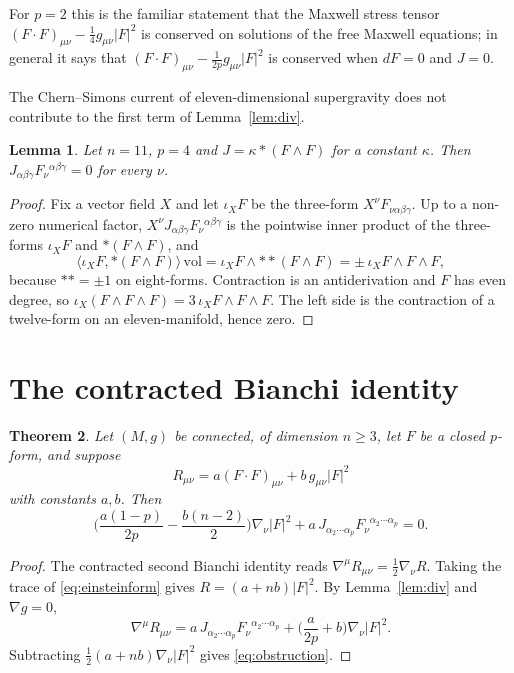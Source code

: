 \documentclass[11pt]{amsart}
\newtheorem{theorem}{Theorem}[section]
\newtheorem{lemma}[theorem]{Lemma}
\theoremstyle{definition}
\newcommand{\FF}{(F\!\cdot\! F)}
\begin{document}
For $p=2$ this is the familiar statement that the Maxwell stress tensor $\FF_{\mu\nu}-\frac14g_{\mu\nu}|F|^2$ is conserved on solutions of the free Maxwell equations; in general it says that $\FF_{\mu\nu}-\frac{1}{2p}g_{\mu\nu}|F|^2$ is conserved when $dF=0$ and $J=0$.

The Chern--Simons current of eleven-dimensional supergravity does not contribute to the first term of Lemma~\ref{lem:div}.

\begin{lemma}\label{lem:cs}
Let $n=11$, $p=4$ and $J=\kappa\ast(F\wedge F)$ for a constant $\kappa$. Then $J_{\alpha\beta\gamma}F_\nu{}^{\alpha\beta\gamma}=0$ for every $\nu$.
\end{lemma}

\begin{proof}
Fix a vector field $X$ and let $\iota_XF$ be the three-form $X^\nu F_{\nu\alpha\beta\gamma}$. Up to a non-zero numerical factor, $X^\nu J_{\alpha\beta\gamma}F_\nu{}^{\alpha\beta\gamma}$ is the pointwise inner product of the three-forms $\iota_XF$ and $\ast(F\wedge F)$, and
\[
\langle\iota_XF,\ast(F\wedge F)\rangle\,\mathrm{vol}=\iota_XF\wedge\ast\ast(F\wedge F)=\pm\,\iota_XF\wedge F\wedge F,
\]
because $\ast\ast=\pm1$ on eight-forms. Contraction is an antiderivation and $F$ has even degree, so $\iota_X(F\wedge F\wedge F)=3\,\iota_XF\wedge F\wedge F$. The left side is the contraction of a twelve-form on an eleven-manifold, hence zero.
\end{proof}

\section{The contracted Bianchi identity}\label{sec:bianchi}

\begin{theorem}\label{thm:general}
Let $(M,g)$ be connected, of dimension $n\ge3$, let $F$ be a closed $p$-form, and suppose
\begin{equation}\label{eq:einsteinform}
R_{\mu\nu}=a\FF_{\mu\nu}+b\,g_{\mu\nu}|F|^2
\end{equation}
with constants $a,b$. Then
\begin{equation}\label{eq:obstruction}
\Big(\frac{a(1-p)}{2p}-\frac{b(n-2)}{2}\Big)\nabla_\nu|F|^2+a\,J_{\alpha_2\cdots\alpha_p}F_\nu{}^{\alpha_2\cdots\alpha_p}=0 .
\end{equation}
\end{theorem}

\begin{proof}
The contracted second Bianchi identity reads $\nabla^\mu R_{\mu\nu}=\frac12\nabla_\nu R$. Taking the trace of \eqref{eq:einsteinform} gives $R=(a+nb)|F|^2$. By Lemma~\ref{lem:div} and $\nabla g=0$,
\[
\nabla^\mu R_{\mu\nu}=a\,J_{\alpha_2\cdots\alpha_p}F_\nu{}^{\alpha_2\cdots\alpha_p}+\Big(\frac{a}{2p}+b\Big)\nabla_\nu|F|^2 .
\]
Subtracting $\frac12(a+nb)\nabla_\nu|F|^2$ gives \eqref{eq:obstruction}.
\end{proof}
\end{document}
